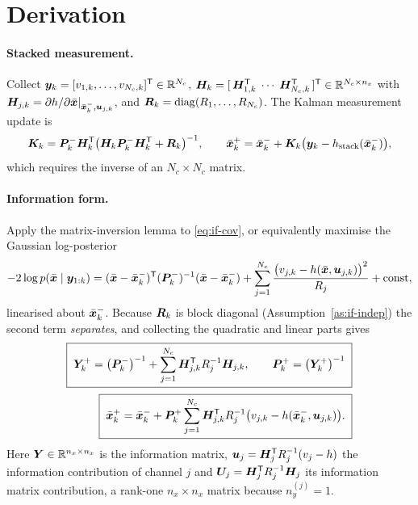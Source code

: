 \section{Derivation}

\paragraph{Stacked measurement.} Collect $\bm{y}_k = [v_{1,k},\dots,v_{N_c,k}]^{\mathsf{T}}\in\mathbb{R}^{N_c}$,
$\bm{H}_k = [\,\bm{H}_{1,k}^{\mathsf{T}}\;\cdots\;\bm{H}_{N_c,k}^{\mathsf{T}}\,]^{\mathsf{T}}\in\mathbb{R}^{N_c\times n_x}$ with
$\bm{H}_{j,k} = \partial h/\partial\bar{\bm{x}}|_{\bar{\bm{x}}^-_k,\bm{u}_{j,k}}$, and
$\bm{R}_k=\operatorname{diag}(R_1,\dots,R_{N_c})$. The Kalman measurement update is
\begin{equation}
\bm{K}_k = \bm{P}^{-}_k\bm{H}_k^{\mathsf{T}}\big(\bm{H}_k\bm{P}^{-}_k\bm{H}_k^{\mathsf{T}}+\bm{R}_k\big)^{-1},\qquad
\bar{\bm{x}}^+_k = \bar{\bm{x}}^-_k + \bm{K}_k\big(\bm{y}_k - h_{\text{stack}}(\bar{\bm{x}}^-_k)\big),
\label{eq:if-cov}
\end{equation}
which requires the inverse of an $N_c\times N_c$ matrix.

\paragraph{Information form.} Apply the matrix-inversion lemma to \eqref{eq:if-cov}, or
equivalently maximise the Gaussian log-posterior
\begin{equation}
-2\log p(\bar{\bm{x}}\mid \bm{y}_{1:k}) = (\bar{\bm{x}}-\bar{\bm{x}}^-_k)^{\mathsf{T}}(\bm{P}^{-}_k)^{-1}(\bar{\bm{x}}-\bar{\bm{x}}^-_k)
 + \sum_{j=1}^{N_c} \frac{\big(v_{j,k}-h(\bar{\bm{x}},\bm{u}_{j,k})\big)^2}{R_j} + \text{const},
\label{eq:if-logpost}
\end{equation}
linearised about $\bar{\bm{x}}^-_k$. Because $\bm{R}_k$ is block diagonal (Assumption~\ref{as:if-indep})
the second term \emph{separates}, and collecting the quadratic and linear parts gives
\begin{align}
\boxed{\;\bm{Y}^+_k = \big(\bm{P}^{-}_k\big)^{-1} + \sum_{j=1}^{N_c}\bm{H}_{j,k}^{\mathsf{T}} R_j^{-1} \bm{H}_{j,k},
 \qquad \bm{P}^{+}_k = \big(\bm{Y}^+_k\big)^{-1} \;} \label{eq:if-Y}\\[2pt]
\boxed{\;\bar{\bm{x}}^+_k = \bar{\bm{x}}^-_k + \bm{P}^{+}_k\sum_{j=1}^{N_c}\bm{H}_{j,k}^{\mathsf{T}} R_j^{-1}
 \big(v_{j,k} - h(\bar{\bm{x}}^-_k,\bm{u}_{j,k})\big).\;} \label{eq:if-x}
\end{align}
Here $\bm{Y}\in\mathbb{R}^{n_x\times n_x}$ is the information matrix,
$\bm{u}_j = \bm{H}_{j}^{\mathsf{T}} R_j^{-1}(v_j - h)$ the information contribution of channel $j$ and
$\bm{U}_j = \bm{H}_j^{\mathsf{T}} R_j^{-1}\bm{H}_j$ its information matrix contribution, a rank-one
$n_x\times n_x$ matrix because $n_y^{(j)}=1$.

